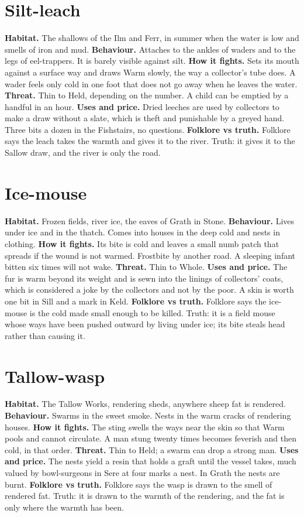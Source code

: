 \documentclass{design/chronicle}
\begin{document}
\section*{Silt-leach}

\textbf{Habitat.} The shallows of the Ilm and Ferr, in summer when the water is low and smells of iron and mud. \textbf{Behaviour.} Attaches to the ankles of waders and to the legs of eel-trappers. It is barely visible against silt. \textbf{How it fights.} Sets its mouth against a surface way and draws Warm slowly, the way a collector’s tube does. A wader feels only cold in one foot that does not go away when he leaves the water. \textbf{Threat.} Thin to Held, depending on the number. A child can be emptied by a handful in an hour. \textbf{Uses and price.} Dried leeches are used by collectors to make a draw without a slate, which is theft and punishable by a greyed hand. Three bits a dozen in the Fishstairs, no questions. \textbf{Folklore vs truth.} Folklore says the leach takes the warmth and gives it to the river. Truth: it gives it to the Sallow draw, and the river is only the road.

\section*{Ice-mouse}

\textbf{Habitat.} Frozen fields, river ice, the eaves of Grath in Stone. \textbf{Behaviour.} Lives under ice and in the thatch. Comes into houses in the deep cold and nests in clothing. \textbf{How it fights.} Its bite is cold and leaves a small numb patch that spreads if the wound is not warmed. Frostbite by another road. A sleeping infant bitten six times will not wake. \textbf{Threat.} Thin to Whole. \textbf{Uses and price.} The fur is warm beyond its weight and is sewn into the linings of collectors’ coats, which is considered a joke by the collectors and not by the poor. A skin is worth one bit in Sill and a mark in Keld. \textbf{Folklore vs truth.} Folklore says the ice-mouse is the cold made small enough to be killed. Truth: it is a field mouse whose ways have been pushed outward by living under ice; its bite steals head rather than causing it.

\section*{Tallow-wasp}

\textbf{Habitat.} The Tallow Works, rendering sheds, anywhere sheep fat is rendered. \textbf{Behaviour.} Swarms in the sweet smoke. Nests in the warm cracks of rendering houses. \textbf{How it fights.} The sting swells the ways near the skin so that Warm pools and cannot circulate. A man stung twenty times becomes feverish and then cold, in that order. \textbf{Threat.} Thin to Held; a swarm can drop a strong man. \textbf{Uses and price.} The nests yield a resin that holds a graft until the vessel takes, much valued by bowl-surgeons in Sere at four marks a nest. In Grath the nests are burnt. \textbf{Folklore vs truth.} Folklore says the wasp is drawn to the smell of rendered fat. Truth: it is drawn to the warmth of the rendering, and the fat is only where the warmth has been.
\end{document}
